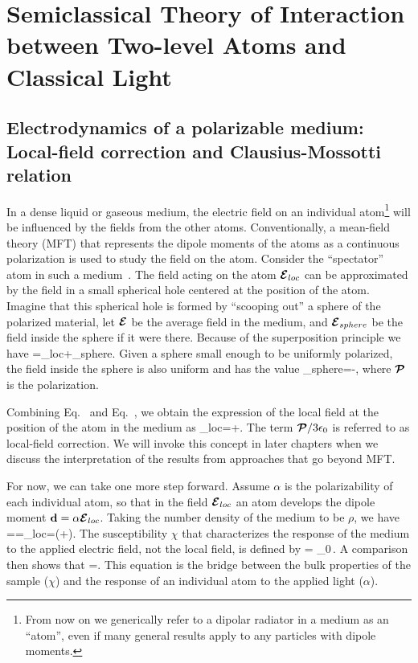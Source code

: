 \chapter{Semiclassical Theory of Interaction between Two-level Atoms and Classical Light}

\section{Electrodynamics of a polarizable medium: Local-field correction and Clausius-Mossotti relation}
\label{LFC}

In a dense liquid or gaseous medium, the electric field on an individual atom\footnote{From now on we generically refer to a dipolar radiator in a medium as an ``atom'', even if many general results apply to any particles with dipole moments.} will be influenced by the fields from the other atoms. Conventionally, a mean-field theory (MFT) that represents the dipole moments of the atoms as a continuous polarization is used to study the field on the atom.  Consider the ``spectator'' atom in such a medium~\cite{feynman}. The field acting on the atom $\cbE_{loc}$ can be approximated by the field in a small spherical hole centered at the position of the atom. Imagine that this spherical hole is formed by ``scooping out'' a sphere of the polarized material, let $\cbE$ be the average field in the medium, and $\cbE_{sphere}$ be the field inside the sphere if it were there. Because of the superposition principle we have
\bea
\cbE=\cbE_{loc}+\cbE_{sphere}.
\label{E_MEAN}
\eea
Given a sphere small enough to be uniformly polarized,  the field inside the sphere is also uniform and has the value
\bea
\cbE_{sphere}=-,
\label{E_SPHERE}
\eea
where  $\cbP$ is the polarization.

Combining Eq.~ and Eq.~, we obtain the expression of the local field at the position of the atom in the medium as
\bea
\cbE_{loc}=\cbE+.
\label{LOCAL_FIELD}
\eea
The term $\cbP/3\epsilon_0$  is referred to as local-field correction. We will invoke this concept in later chapters when we discuss the interpretation of the results from approaches that go beyond MFT.

For now, we can take one more step forward. Assume $\alpha$ is the polarizability of each individual atom, so that in the field $\cbE_{loc}$ an atom develops the dipole moment $\bd = \alpha \cbE_{loc}$.  Taking the number density of the medium to be $\rho$, we have
\bea
{\cbP}=\rho\bd=\rho\alpha\cbE_{loc}=\rho\alpha\left(\cbE+\right).
\label{POLARIZATION}
\eea
The susceptibility $\chi$ that characterizes the response of the medium to the applied electric field, not the local field, is defined by
\beq
{\cbP} = \epsilon_0\chi \cbE\,.
\eeq
A comparison then shows that
\bea
\chi=.
\label{LLLAW}
\eea
This equation is the bridge between the bulk properties of the sample ($\chi$) and the response of an individual atom to the applied light ($\alpha$). 

